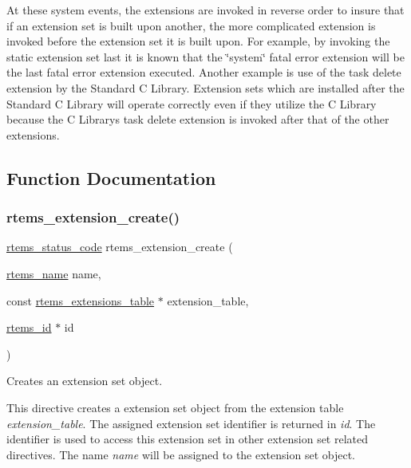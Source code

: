 At these system events, the extensions are invoked in reverse order to insure that if an extension set is built upon another, the more complicated extension is invoked before the extension set it is built upon. For example, by invoking the static extension set last it is known that the \char`\"{}system\char`\"{} fatal error extension will be the last fatal error extension executed. Another example is use of the task delete extension by the Standard C Library. Extension sets which are installed after the Standard C Library will operate correctly even if they utilize the C Library because the C Library\textquotesingle{}s task delete extension is invoked after that of the other extensions. 

\subsection{Function Documentation}
\mbox{\label{group__ClassicUserExtensions_gafcf5ccf8b70f2967ffbf8b493e278fbf}} 
\subsubsection{\texorpdfstring{rtems\_extension\_create()}{rtems\_extension\_create()}}
{\footnotesize\ttfamily \mbox{\hyperlink{group__ClassicStatus_ga545d41846817eaba6143d52ee4d9e9fe}{rtems\+\_\+status\+\_\+code}} rtems\+\_\+extension\+\_\+create (\begin{DoxyParamCaption}\item[{\mbox{\hyperlink{group__ClassicTasks_ga55fb63c49f68c0cbd9bee004da15b1fd}{rtems\+\_\+name}}}]{name,  }\item[{const \mbox{\hyperlink{structUser__extensions__Table}{rtems\+\_\+extensions\+\_\+table}} $\ast$}]{extension\+\_\+table,  }\item[{\mbox{\hyperlink{group__ClassicTasks_gab20892b814dced7dd4e5b9bf42becd57}{rtems\+\_\+id}} $\ast$}]{id }\end{DoxyParamCaption})}



Creates an extension set object. 

This directive creates a extension set object from the extension table {\itshape extension\+\_\+table}. The assigned extension set identifier is returned in {\itshape id}. The identifier is used to access this extension set in other extension set related directives. The name {\itshape name} will be assigned to the extension set object.

